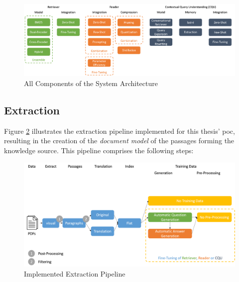 \begin{figure}
    \centering
    \includegraphics[width=\textwidth]{Grafiken/all_components_conrag.png}
    \caption{All Components of the System Architecture}
    \label{fig:all-components-conrag-grid}
\end{figure}

\subsection{Extraction}
\label{subsec:index}

Figure \ref{fig:extract-pipeline-implementation} illustrates the extraction pipeline implemented for this thesis' \gls{poc}, resulting in the creation of the \textit{document model} of the passages forming the knowledge source. This pipeline comprises the following steps:

\begin{figure}
    \centering
    \includegraphics[width=\textwidth]{Grafiken/Evaluation/extract_implemented.png}
    \caption{Implemented Extraction Pipeline}
    \label{fig:extract-pipeline-implementation}
\end{figure}

